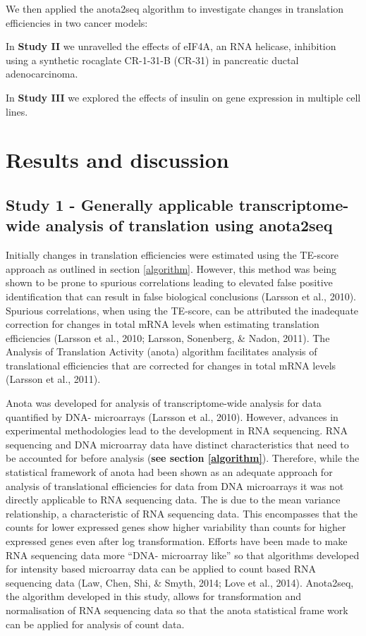 \documentclass[12pt,openany]{book}
\begin{document}
We then applied the anota2seq algorithm to investigate changes in
translation efficiencies in two cancer models:

In \textbf{Study II} we unravelled the effects of eIF4A, an RNA
helicase, inhibition using a synthetic rocaglate CR-1-31-B (CR-31) in
pancreatic ductal adenocarcinoma.

In \textbf{Study III} we explored the effects of insulin on gene
expression in multiple cell lines.

\chapter{Results and discussion}

\section{Study 1 - Generally applicable transcriptome-wide analysis of translation using anota2seq}

Initially changes in translation efficiencies were estimated using the
TE-score approach as outlined in section \ref{algorithm}. However, this
method was being shown to be prone to spurious correlations leading to
elevated false positive identification that can result in false
biological conclusions (Larsson et al., 2010). Spurious correlations,
when using the TE-score, can be attributed the inadequate correction for
changes in total mRNA levels when estimating translation efficiencies
(Larsson et al., 2010; Larsson, Sonenberg, \& Nadon, 2011). The Analysis
of Translation Activity (anota) algorithm facilitates analysis of
translational efficiencies that are corrected for changes in total mRNA
levels (Larsson et al., 2011).

Anota was developed for analysis of transcriptome-wide analysis for data
quantified by DNA- microarrays (Larsson et al., 2010). However, advances
in experimental methodologies lead to the development in RNA sequencing.
RNA sequencing and DNA microarray data have distinct characteristics
that need to be accounted for before analysis (\textbf{see section
\ref{algorithm}}). Therefore, while the statistical framework of anota
had been shown as an adequate approach for analysis of translational
efficiencies for data from DNA microarrays it was not directly
applicable to RNA sequencing data. The is due to the mean variance
relationship, a characteristic of RNA sequencing data. This encompasses
that the counts for lower expressed genes show higher variability than
counts for higher expressed genes even after log transformation. Efforts
have been made to make RNA sequencing data more ``DNA- microarray like''
so that algorithms developed for intensity based microarray data can be
applied to count based RNA sequencing data (Law, Chen, Shi, \& Smyth,
2014; Love et al., 2014). Anota2seq, the algorithm developed in this
study, allows for transformation and normalisation of RNA sequencing
data so that the anota statistical frame work can be applied for
analysis of count data.
\end{document}
